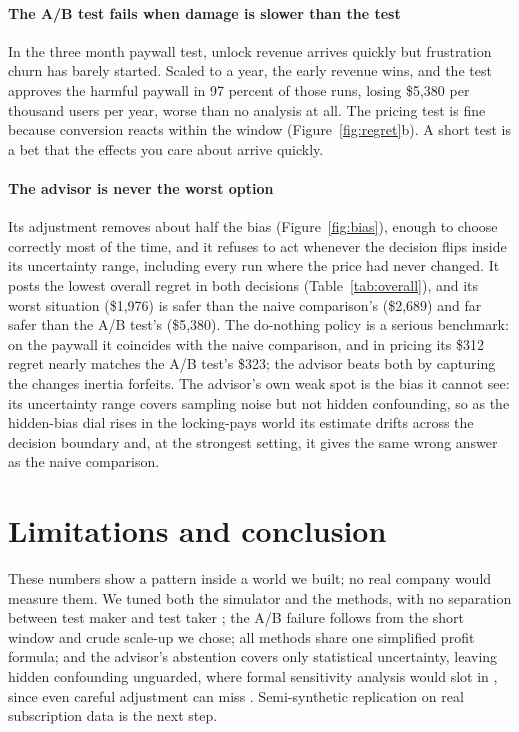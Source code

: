 \documentclass[10pt]{article}
\begin{document}
\paragraph{The A/B test fails when damage is slower than the test}
In the three month paywall test, unlock revenue arrives quickly but
frustration churn has barely started. Scaled to a year, the early revenue
wins, and the test approves the harmful paywall in 97 percent of those runs,
losing \$5{,}380 per thousand users per year, worse than no analysis at all.
The pricing test is fine because conversion reacts within the window
(Figure~\ref{fig:regret}b). A short test is a bet that the effects you care
about arrive quickly.

\paragraph{The advisor is never the worst option}
Its adjustment removes about half the bias (Figure~\ref{fig:bias}), enough
to choose correctly most of the time, and it refuses to act whenever the
decision flips inside its uncertainty range, including every run where the
price had never changed. It posts the lowest overall regret in both
decisions (Table~\ref{tab:overall}), and its worst situation (\$1{,}976)
is safer than the naive comparison's (\$2{,}689) and far safer than the
A/B test's (\$5{,}380). The do-nothing policy is a serious benchmark: on the
paywall it coincides with the naive comparison, and in pricing its \$312
regret nearly matches the A/B test's \$323; the advisor beats both by
capturing the changes inertia forfeits. The advisor's own weak spot is the bias it cannot see:
its uncertainty range covers sampling noise but not hidden confounding, so
as the hidden-bias dial rises in the locking-pays world its estimate
drifts across the decision boundary and, at the strongest setting, it
gives the same wrong answer as the naive comparison.

\section{Limitations and conclusion}
These numbers show a pattern inside a world we built; no real company
would measure them. We
tuned both the simulator and the methods, with no separation between test
maker and test taker \citep{hahn2019}; the A/B failure follows from the
short window and crude scale-up we chose; all methods share one simplified
profit formula; and the advisor's abstention covers only statistical
uncertainty, leaving hidden confounding unguarded, where formal
sensitivity analysis would slot in \citep{chernozhukov2018}, since even
careful adjustment can miss \citep{young2026}. Semi-synthetic replication
on real subscription data is the next step.
\end{document}
